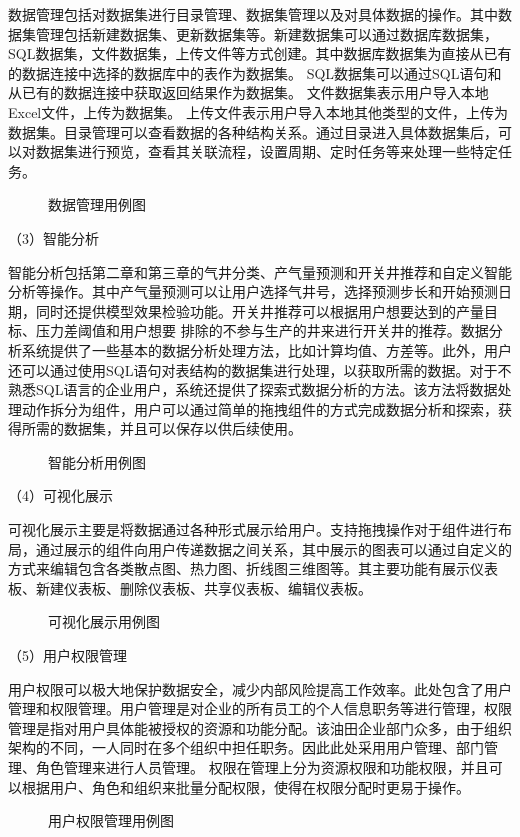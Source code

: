 数据管理包括对数据集进行目录管理、数据集管理以及对具体数据的操作。其中数据集管理包括新建数据集、更新数据集等。新建数据集可以通过数据库数据集，SQL数据集，文件数据集，上传文件等方式创建。其中数据库数据集为直接从已有的数据连接中选择的数据库中的表作为数据集。
SQL数据集可以通过SQL语句和从已有的数据连接中获取返回结果作为数据集。
文件数据集表示用户导入本地Excel文件，上传为数据集。
上传文件表示用户导入本地其他类型的文件，上传为数据集。目录管理可以查看数据的各种结构关系。通过目录进入具体数据集后，可以对数据集进行预览，查看其关联流程，设置周期、定时任务等来处理一些特定任务。
\begin{figure}[H]
    \centering
    \caption{数据管理用例图}
\end{figure}

（3）智能分析

智能分析包括第二章和第三章的气井分类、产气量预测和开关井推荐和自定义智能分析等操作。其中产气量预测可以让用户选择气井号，选择预测步长和开始预测日期，同时还提供模型效果检验功能。开关井推荐可以根据用户想要达到的产量目标、压力差阈值和用户想要
排除的不参与生产的井来进行开关井的推荐。数据分析系统提供了一些基本的数据分析处理方法，比如计算均值、方差等。此外，用户还可以通过使用SQL语句对表结构的数据集进行处理，以获取所需的数据。对于不熟悉SQL语言的企业用户，系统还提供了探索式数据分析的方法。该方法将数据处理动作拆分为组件，用户可以通过简单的拖拽组件的方式完成数据分析和探索，获得所需的数据集，并且可以保存以供后续使用。
\begin{figure}[H]
    \centering
    \caption{智能分析用例图}
\end{figure}

（4）可视化展示

可视化展示主要是将数据通过各种形式展示给用户。支持拖拽操作对于组件进行布局，通过展示的组件向用户传递数据之间关系，其中展示的图表可以通过自定义的方式来编辑包含各类散点图、热力图、折线图三维图等。其主要功能有展示仪表板、新建仪表板、删除仪表板、共享仪表板、编辑仪表板。
\begin{figure}[H]
    \centering
    \caption{可视化展示用例图}
\end{figure}

（5）用户权限管理

用户权限可以极大地保护数据安全，减少内部风险提高工作效率。此处包含了用户管理和权限管理。用户管理是对企业的所有员工的个人信息职务等进行管理，权限管理是指对用户具体能被授权的资源和功能分配。该油田企业部门众多，由于组织架构的不同，一人同时在多个组织中担任职务。因此此处采用用户管理、部门管理、角色管理来进行人员管理。
权限在管理上分为资源权限和功能权限，并且可以根据用户、角色和组织来批量分配权限，使得在权限分配时更易于操作。
\begin{figure}[H]
    \centering
    \caption{用户权限管理用例图}
\end{figure}
